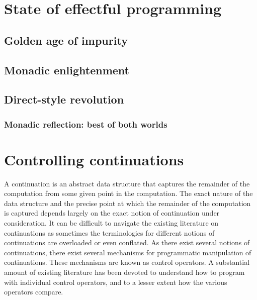 \documentclass[12pt,phd,lfcs,twoside,openright,logo,leftchapter,normalheadings]{infthesis}
\theoremstyle{plain}
\theoremstyle{definition}
\begin{document}
\chapter{State of effectful programming}
\label{ch:related-work}

\section{Golden age of impurity}
\section{Monadic enlightenment}
\section{Direct-style revolution}

\subsection{Monadic reflection: best of both worlds}

\chapter{Controlling continuations}
\label{ch:continuations}
%

A continuation is an abstract data structure that captures the
remainder of the computation from some given point in the computation.
%
The exact nature of the data structure and the precise point at which
the remainder of the computation is captured depends largely on the
exact notion of continuation under consideration.
%
It can be difficult to navigate the existing literature on
continuations as sometimes the terminologies for different notions of
continuations are overloaded or even conflated.
%
As there exist several notions of continuations, there exist several
mechanisms for programmatic manipulation of continuations. These
mechanisms are known as control operators.
%
A substantial amount of existing literature has been devoted to
understand how to program with individual control operators, and to a
lesser extent how the various operators compare.
\end{document}
